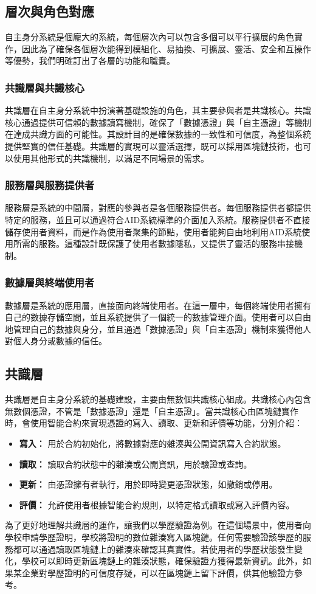 \subsection{層次與角色對應}
自主身分系統是個龐大的系統，每個層次內可以包含多個可以平行擴展的角色實作，因此為了確保各個層次能得到模組化、易抽換、可擴展、靈活、安全和互操作等優勢，我們明確訂出了各層的功能和職責。
\subsubsection{共識層與共識核心}
共識層在自主身分系統中扮演著基礎設施的角色，其主要參與者是共識核心。共識核心通過提供可信賴的數據讀寫機制，確保了「數據憑證」與「自主憑證」等機制在達成共識方面的可能性。其設計目的是確保數據的一致性和可信度，為整個系統提供堅實的信任基礎。共識層的實現可以靈活選擇，既可以採用區塊鏈技術，也可以使用其他形式的共識機制，以滿足不同場景的需求。
\subsubsection{服務層與服務提供者}
服務層是系統的中間層，對應的參與者是各個服務提供者。每個服務提供者都提供特定的服務，並且可以通過符合AID系統標準的介面加入系統。服務提供者不直接儲存使用者資料，而是作為使用者聚集的節點，使用者能夠自由地利用AID系統使用所需的服務。這種設計既保護了使用者數據隱私，又提供了靈活的服務串接機制。
\subsubsection{數據層與終端使用者}
數據層是系統的應用層，直接面向終端使用者。在這一層中，每個終端使用者擁有自己的數據存儲空間，並且系統提供了一個統一的數據管理介面。使用者可以自由地管理自己的數據與身分，並且通過「數據憑證」與「自主憑證」機制來獲得他人對個人身分或數據的信任。
\subsection{共識層}
共識層是自主身分系統的基礎建設，主要由無數個共識核心組成。共識核心內包含無數個憑證，不管是「數據憑證」還是「自主憑證」。當共識核心由區塊鏈實作時，會使用智能合約來實現憑證的寫入、讀取、更新和評價等功能，分別介紹：
\begin{itemize}
  \item \textbf{寫入：} 用於合約初始化，將數據對應的雜湊與公開資訊寫入合約狀態。
  \item \textbf{讀取：} 讀取合約狀態中的雜湊或公開資訊，用於驗證或查詢。
  \item \textbf{更新：} 由憑證擁有者執行，用於即時變更憑證狀態，如撤銷或停用。
  \item \textbf{評價：} 允許使用者根據智能合約規則，以特定格式讀取或寫入評價內容。
\end{itemize}
為了更好地理解共識層的運作，讓我們以學歷驗證為例。在這個場景中，使用者向學校申請學歷證明，學校將證明的數位雜湊寫入區塊鏈。任何需要驗證該學歷的服務都可以通過讀取區塊鏈上的雜湊來確認其真實性。若使用者的學歷狀態發生變化，學校可以即時更新區塊鏈上的雜湊狀態，確保驗證方獲得最新資訊。此外，如果某企業對學歷證明的可信度存疑，可以在區塊鏈上留下評價，供其他驗證方參考。

